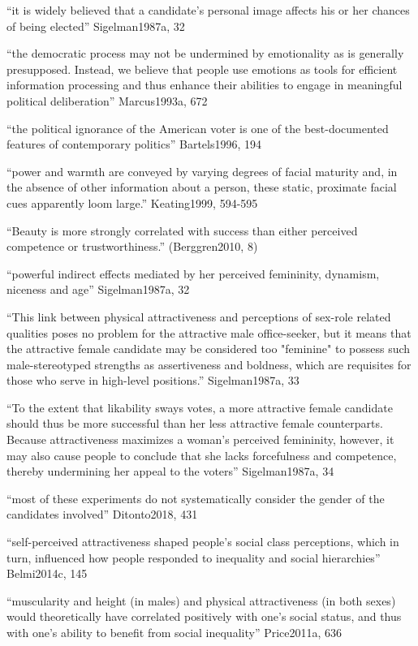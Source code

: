 ``it is widely believed that a candidate's personal image affects his or her chances of being elected'' Sigelman1987a, 32

``the democratic process may not be undermined by emotionality as is generally presupposed. Instead, we believe that people use emotions as tools for efficient information processing and thus enhance their abilities to engage in meaningful political deliberation'' Marcus1993a, 672

``the political ignorance of the American voter is one of the best-documented features of contemporary politics'' Bartels1996, 194

``power and warmth are conveyed by varying degrees of facial maturity and, in the absence of other information about a person, these static, proximate facial cues apparently loom large.'' Keating1999, 594-595

``Beauty is more strongly correlated with success than either perceived competence or trustworthiness.'' (Berggren2010, 8)



``powerful indirect effects mediated by her perceived femininity, dynamism, niceness and age'' Sigelman1987a, 32

``This link between physical attractiveness and perceptions of sex-role related qualities poses no problem for the attractive male office-seeker, but it means that the attractive female candidate may be considered too "feminine" to possess such male-stereotyped strengths as assertiveness and boldness, which are requisites for those who serve in high-level positions.''  Sigelman1987a, 33

``To the extent that likability sways votes, a more attractive female candidate should thus be more successful than her less attractive female counterparts. Because attractiveness maximizes a woman's perceived femininity, however, it may also cause people to conclude that she lacks forcefulness and competence, thereby undermining her appeal to the voters''  Sigelman1987a, 34

``most of these experiments do not systematically consider the gender of the candidates involved'' Ditonto2018, 431


``self-perceived attractiveness shaped people's social class perceptions, which in turn, influenced how people responded to inequality and social hierarchies'' Belmi2014c, 145

``muscularity and height (in males) and physical attractiveness (in both sexes) would theoretically have correlated positively with one’s social status, and thus with one's ability to benefit from social inequality'' Price2011a, 636


